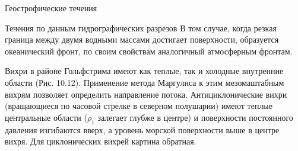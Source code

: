 \begin{chapter}{Геострофические течения}
\begin{section}{Течения по данным гидрографических разрезов}
В том случае, когда резкая граница между двумя водными массами
достигает поверхности, образуется океанический фронт, по своим
свойствам аналогичный атмосферным фронтам.
%

Вихри в районе Гольфстрима имеют как теплые, так и холодные внутренние
области (Рис. 10.12). Применение метода Маргулиса к этим мезомаштабным
вихрям позволяет определить направление потока. Антициклонические
вихри (вращающиеся по часовой стрелке в северном полушарии) имеют
теплые центральные области ($\rho_1$ залегает глубже в центре) и поверхности
постоянного давления изгибаются вверх, а уровень морской поверхности
выше в центре вихря. Для циклонических вихрей картина обратная.
%


\end{section}
\end{chapter}

